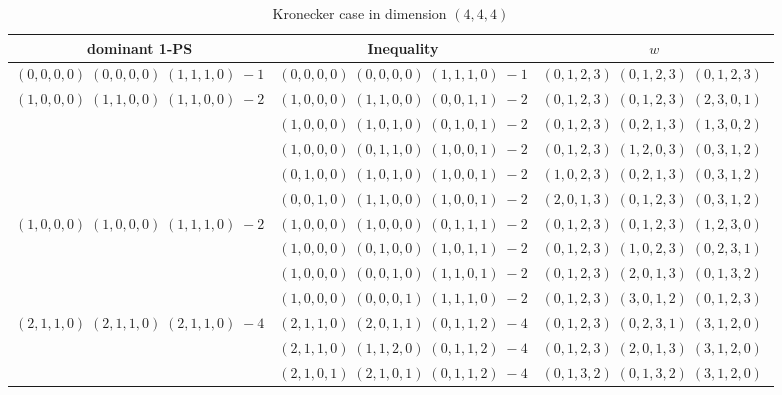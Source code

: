 \documentclass[11pt]{article}
\begin{document}
 
 \begin{longtable}[l]{|c|c|c|} 
 \caption{Kronecker case in dimension $(4,4,4)$} \\  
 
 \hline 
 \textrm{dominant 1-PS} & \textrm{Inequality} & $w$ \\ 
 \hline\multirow[t]{1}{*}{ $(0 ,0 ,0 ,0) \;(0 ,0 ,0 ,0) \;(1 ,1 ,1 ,0) \;-1$ }  & $(0 ,0 ,0 ,0) \;(0 ,0 ,0 ,0) \;(1 ,1 ,1 ,0) \;-1$ & $(0 ,1 ,2 ,3) \;(0 ,1 ,2 ,3) \;(0 ,1 ,2 ,3) \;$\\ \hline\multirow[t]{5}{*}{ $(1 ,0 ,0 ,0) \;(1 ,1 ,0 ,0) \;(1 ,1 ,0 ,0) \;-2$ }  & $(1 ,0 ,0 ,0) \;(1 ,1 ,0 ,0) \;(0 ,0 ,1 ,1) \;-2$ & $(0 ,1 ,2 ,3) \;(0 ,1 ,2 ,3) \;(2 ,3 ,0 ,1) \;$\\ 
 \cline{2-3} 
 & $(1 ,0 ,0 ,0) \;(1 ,0 ,1 ,0) \;(0 ,1 ,0 ,1) \;-2$ & $(0 ,1 ,2 ,3) \;(0 ,2 ,1 ,3) \;(1 ,3 ,0 ,2) \;$\\ 
 \cline{2-3} 
 & $(1 ,0 ,0 ,0) \;(0 ,1 ,1 ,0) \;(1 ,0 ,0 ,1) \;-2$ & $(0 ,1 ,2 ,3) \;(1 ,2 ,0 ,3) \;(0 ,3 ,1 ,2) \;$\\ 
 \cline{2-3} 
 & $(0 ,1 ,0 ,0) \;(1 ,0 ,1 ,0) \;(1 ,0 ,0 ,1) \;-2$ & $(1 ,0 ,2 ,3) \;(0 ,2 ,1 ,3) \;(0 ,3 ,1 ,2) \;$\\ 
 \cline{2-3} 
 & $(0 ,0 ,1 ,0) \;(1 ,1 ,0 ,0) \;(1 ,0 ,0 ,1) \;-2$ & $(2 ,0 ,1 ,3) \;(0 ,1 ,2 ,3) \;(0 ,3 ,1 ,2) \;$\\ \hline\multirow[t]{4}{*}{ $(1 ,0 ,0 ,0) \;(1 ,0 ,0 ,0) \;(1 ,1 ,1 ,0) \;-2$ }  & $(1 ,0 ,0 ,0) \;(1 ,0 ,0 ,0) \;(0 ,1 ,1 ,1) \;-2$ & $(0 ,1 ,2 ,3) \;(0 ,1 ,2 ,3) \;(1 ,2 ,3 ,0) \;$\\ 
 \cline{2-3} 
 & $(1 ,0 ,0 ,0) \;(0 ,1 ,0 ,0) \;(1 ,0 ,1 ,1) \;-2$ & $(0 ,1 ,2 ,3) \;(1 ,0 ,2 ,3) \;(0 ,2 ,3 ,1) \;$\\ 
 \cline{2-3} 
 & $(1 ,0 ,0 ,0) \;(0 ,0 ,1 ,0) \;(1 ,1 ,0 ,1) \;-2$ & $(0 ,1 ,2 ,3) \;(2 ,0 ,1 ,3) \;(0 ,1 ,3 ,2) \;$\\ 
 \cline{2-3} 
 & $(1 ,0 ,0 ,0) \;(0 ,0 ,0 ,1) \;(1 ,1 ,1 ,0) \;-2$ & $(0 ,1 ,2 ,3) \;(3 ,0 ,1 ,2) \;(0 ,1 ,2 ,3) \;$\\ \hline\multirow[t]{12}{*}{ $(2 ,1 ,1 ,0) \;(2 ,1 ,1 ,0) \;(2 ,1 ,1 ,0) \;-4$ }  & $(2 ,1 ,1 ,0) \;(2 ,0 ,1 ,1) \;(0 ,1 ,1 ,2) \;-4$ & $(0 ,1 ,2 ,3) \;(0 ,2 ,3 ,1) \;(3 ,1 ,2 ,0) \;$\\ 
 \cline{2-3} 
 & $(2 ,1 ,1 ,0) \;(1 ,1 ,2 ,0) \;(0 ,1 ,1 ,2) \;-4$ & $(0 ,1 ,2 ,3) \;(2 ,0 ,1 ,3) \;(3 ,1 ,2 ,0) \;$\\ 
 \cline{2-3} 
 & $(2 ,1 ,0 ,1) \;(2 ,1 ,0 ,1) \;(0 ,1 ,1 ,2) \;-4$ & $(0 ,1 ,3 ,2) \;(0 ,1 ,3 ,2) \;(3 ,1 ,2 ,0) \;$\\ 

\end{longtable}
\end{document}
